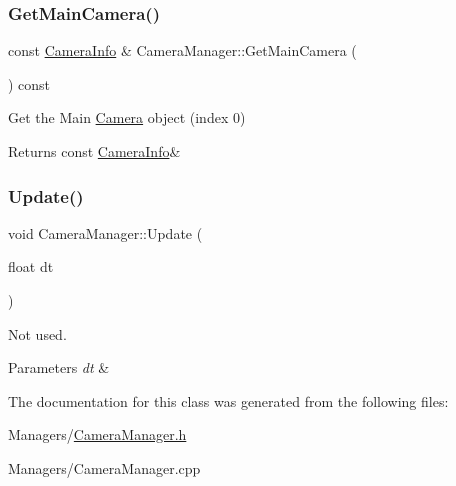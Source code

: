 \subsubsection{\texorpdfstring{Get\+Main\+Camera()}{GetMainCamera()}}
{\footnotesize\ttfamily const \hyperlink{structCameraInfo}{Camera\+Info} \& Camera\+Manager\+::\+Get\+Main\+Camera (\begin{DoxyParamCaption}{ }\end{DoxyParamCaption}) const}



Get the Main \hyperlink{classCamera}{Camera} object (index 0) 

\begin{DoxyReturn}{Returns}
const \hyperlink{structCameraInfo}{Camera\+Info}\& 
\end{DoxyReturn}
\mbox{\label{classCameraManager_a7667fa4d71bf8b1630c60d4e5e7864eb}} 
\subsubsection{\texorpdfstring{Update()}{Update()}}
{\footnotesize\ttfamily void Camera\+Manager\+::\+Update (\begin{DoxyParamCaption}\item[{float}]{dt }\end{DoxyParamCaption})}



Not used. 


\begin{DoxyParams}{Parameters}
{\em dt} & \\
\hline
\end{DoxyParams}


The documentation for this class was generated from the following files\+:\begin{DoxyCompactItemize}
\item 
Managers/\hyperlink{CameraManager_8h}{Camera\+Manager.\+h}\item 
Managers/Camera\+Manager.\+cpp\end{DoxyCompactItemize}
